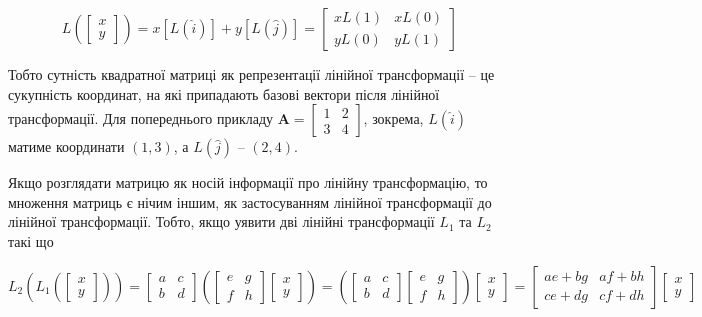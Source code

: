 \documentclass[
  11pt,
]{book}
\begin{document}
\[L \left( \begin{bmatrix} x \\ y \end{bmatrix} \right) = x[L (\hat{i})] + y[L(\hat{j})] = \begin{bmatrix} x L(1) & xL(0) \\ y L(0) & y L(1) \end{bmatrix}\]

Тобто сутність квадратної матриці як репрезентації лінійної трансформації -- це сукупність координат, на які припадають базові вектори після лінійної трансформації. Для попереднього прикладу \(\mathbf{A} = \begin{bmatrix} 1 & 2 \\ 3 & 4 \end{bmatrix}\), зокрема, \(L(\hat{i})\) матиме координати \((1, 3)\), а \(L(\hat{j})\) -- \((2, 4)\).

Якщо розглядати матрицю як носій інформації про лінійну трансформацію, то множення матриць є нічим іншим, як застосуванням лінійної трансформації до лінійної трансформації. Тобто, якщо уявити дві лінійні трансформації \(L_1\) та \(L_2\) такі що

\[L_2 \left( L_1 \left( \begin{bmatrix} 
x \\ 
y 
\end{bmatrix} \right) \right) = 
\begin{bmatrix} 
a & c \\ 
b & d
\end{bmatrix}
\left( 
\begin{bmatrix} 
e & g \\ 
f & h
\end{bmatrix}
\begin{bmatrix} 
x \\ 
y 
\end{bmatrix}
\right) = 
\left( 
\begin{bmatrix} 
a & c \\ 
b & d
\end{bmatrix}
\begin{bmatrix} 
e & g \\ 
f & h
\end{bmatrix}
\right)
\begin{bmatrix} 
x \\ 
y 
\end{bmatrix} = 
\begin{bmatrix} 
ae + bg & af + bh \\ 
ce + dg & cf + dh
\end{bmatrix}
\begin{bmatrix} 
x \\ 
y 
\end{bmatrix}\]
\end{document}

